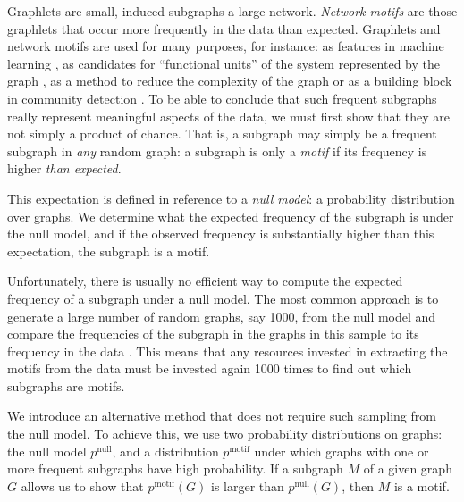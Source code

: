 \documentclass[twoside,11pt]{article}
\begin{document}
Graphlets are small, induced subgraphs a large network. \emph{Network motifs} \citep{milo2002network} are those graphlets that occur more frequently in the data than expected. Graphlets and network motifs are used for many purposes, for instance: as features in machine learning \citep{shervashidze2009efficient,wu2011characterizing}, as candidates for ``functional units'' of the system represented by the graph \citep{milo2002network}, as a method to reduce the complexity of the graph \citep{koutra2015summarizing} or as a building block in community detection \citep{arenas2008motif}. To be able to conclude that such frequent subgraphs really represent meaningful aspects of the data, we must first show that they are not simply a product of chance. That is, a subgraph may simply be a frequent subgraph in \emph{any} random graph: a subgraph is only a \emph{motif} if its frequency is higher \emph{than expected}.

This expectation is defined in reference to a \emph{null model}: a probability distribution over graphs. We determine what the expected frequency of the subgraph is under the null model, and if the observed frequency is substantially higher than this expectation, the subgraph is a motif.\footnotemark 


Unfortunately, there is usually no efficient way to compute the expected frequency of a subgraph under a null model. The most common approach is to generate a large number of random graphs, say 1000, from the null model and compare the frequencies of the subgraph in the graphs in this sample to its frequency in the data \citep{milo2002network}. This means that any resources invested in extracting the motifs from the data must be invested again 1000 times to find out which subgraphs are motifs.

We introduce an alternative method that does not require such sampling from the null model. To achieve this, we use two probability distributions on graphs: the null model $p^\text{null}$, and a distribution $p^\text{motif}$ under which graphs with one or more frequent subgraphs have high probability. If a subgraph $M$ of a given graph $G$ allows us to show that $p^\text{motif}(G)$ is larger than $p^\text{null}(G)$, then $M$ is a motif. 
\end{document}
